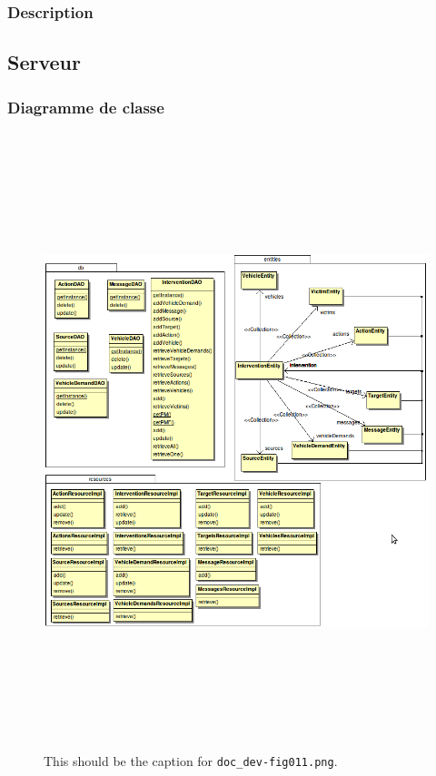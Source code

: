 \documentclass{article}
\begin{document}
\vspace{27pt}
\subsubsection*{{\color{color02} \textbf{Description\label{h.r6665ylnfk1i}\label{h.xjiw3olwcxmd}\label{h.j7cm8m8rw09i}}}}

\vspace{31pt}
\subsection*{{\large {\color{color01} \textbf{Serveur\label{h.v0qp8r13qoia}}}}}

\vspace{14pt}
\subsubsection*{{\color{color02} \textbf{Diagramme de classe}}}

\begin{figure}[htbp]
\begin{center}
\includegraphics[width=526pt, height=509pt]{doc_dev-fig011.png}
\caption{This should be the caption for \texttt{doc\_dev-fig011.png}.}
\end{center}
\end{figure}\label{h.sumgetufwhm2}
\end{document}
